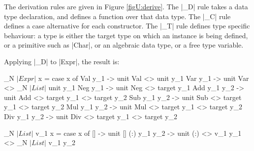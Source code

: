 The derivation rules are given in Figure \ref{figU:derive}. The |_D| rule takes a data type declaration, and defines a function over that data type. The |_C| rule defines a case alternative for each constructor. The |_T| rule defines type specific behaviour: a type is either the target type on which an instance is being defined, or a primitive such as |Char|, or an algebraic data type, or a free type variable.

\begin{comment}

To model the derivation of an instance, it is necessary to have a model of data types:

\begin{code}
data Data  = Data  Name [Var] [Ctor]
data Ctor  = Ctor  Name [Type]
data Type  = TyPrim | TyVar Var | TyApp Data [Type]

type Name  = String
type Var   = String
\end{code}

\begin{code}
isTarget :: a -> Bool
\end{code}

When writing a |Uniplate| instance for a particular data type, |isTarget| returns True for that data type. We define how to produce a function for a given |Data| type using the |_D| function:

\begin{code}


unwords $
    ['d':name] ++ vars ++ ["x ="] ++
    ["case x of {"] ++
        separate ";" (map _C ctors) ++
    ["}"]

_C (Ctor name typs) =
    [name] ++ vars ++ [" -> "] ++
    ["unit"] ++ [name] ++ ["<>"] ++
    separate "<>" (zipWith (:) vars (map _T typs))
    where vars = ['v':show i | i <- [1..length typs]]

_T (TyPrim                       ) = ["unit"]
_T (TyVar  v                     ) = [v]
_T (TyApp  d@(Data name _ _) ts  )
    | isTarget d  = ["target"]
    | otherwise   = ['d':name] ++ concatMap _T ts

separate sep xs = concat $ intersperse [sep] xs
\end{code}

\end{comment}

Applying |_D| to |Expr|, the result is:

\begin{code}
_N $| Expr |$ \? x = case x of
    Val  y_1      -> unit Val  <> unit y_1
    Var  y_1      -> unit Var  <> _N $| List |$ \? unit y_1
    Neg  y_1      -> unit Neg  <> target y_1
    Add  y_1 y_2  -> unit Add  <> target y_1 <> target y_2
    Sub  y_1 y_2  -> unit Sub  <> target y_1 <> target y_2
    Mul  y_1 y_2  -> unit Mul  <> target y_1 <> target y_2
    Div  y_1 y_2  -> unit Div  <> target y_1 <> target y_2

_N $| List |$ \? v_1 x = case x of
    []            -> unit []
    (:)  y_1 y_2  -> unit (:) <> v_1 y_1 <> _N $| List |$ \? v_1 y_2
\end{code}

